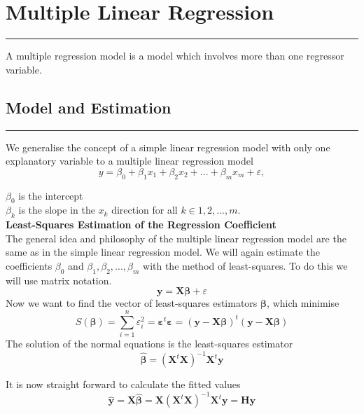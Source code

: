 \section{Multiple Linear Regression}
\noindent\rule[\linienAbstand]{\linewidth}{\linienDickeDick}
A multiple regression model is a model which involves more than one regressor variable.\\

\subsection{Model and Estimation}
\noindent\rule[\linienAbstand]{\linewidth}{\linienDicke}
We generalise the concept of a simple linear regression model with only one explanatory variable to a multiple linear regression model
\begin{equation}
  y = \beta_0 + \beta_1 x_1 + \beta_2 x_2 + ... + \beta_m x_m +\varepsilon,
\end{equation}

$\beta_0$ is the intercept\\
$\beta_k$ is the slope in the $x_k$ direction for all $k \in {1, 2, ..., m}$.\\

\textbf{Least-Squares Estimation of the Regression Coefficient}\\
The general idea and philosophy of the multiple linear regression model are the same as in the simple linear regression model. We will again estimate the coefficients $\beta_0$ and $\beta_1, \beta_2, . . . , \beta_m$ with the method of least-squares. To do this we will use matrix notation.
\begin{equation}
  \mathbf{y} = \mathbf{X} \pmb{\beta} + \varepsilon
\end{equation}
Now we want to find the vector of least-squares estimators $\pmb{\beta}$, which minimise
\begin{equation}
  S(\pmb{\beta}) = \sum^n_{i=1} \varepsilon^2_i = \pmb{\varepsilon}^t\pmb{\varepsilon} = (\mathbf{y} - \mathbf{X}\pmb{\beta})^t (\mathbf{y} - \mathbf{X}\pmb{\beta})
\end{equation}
The solution of the normal equations is the least-squares estimator
\begin{equation}
  \hat{\pmb{\beta}} = (\mathbf{X}^t\mathbf{X})^{-1}\mathbf{X}^t \mathbf{y}
\end{equation}

It is now straight forward to calculate the fitted values
\begin{equation}
  \hat{\mathbf{y}} = \mathbf{X}\hat{\pmb{\beta}} = \mathbf{X}(\mathbf{X}^t\mathbf{X})^{-1}\mathbf{X}^t \mathbf{y} = \mathbf{H}\mathbf{y}
\end{equation}

